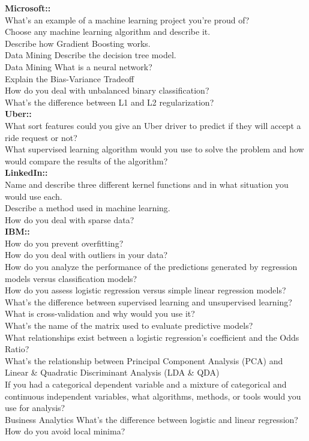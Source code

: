 \documentclass[11pt]{article}
\begin{document}
{\bf Microsoft:: }\\
What’s an example of a machine learning project you’re proud of?\\
Choose any machine learning algorithm and describe it.\\
Describe how Gradient Boosting works.\\
Data Mining Describe the decision tree model.\\
Data Mining What is a neural network?\\
Explain the Bias-Variance Tradeoff\\
How do you deal with unbalanced binary classification?\\
What’s the difference between L1 and L2 regularization?\\

{\bf Uber:: }  \\
What sort features could you give an Uber driver to predict if they will accept a ride request or not? \\ 
What supervised learning algorithm would you use to solve the problem and how would compare the results of the algorithm?\\

{\bf LinkedIn:: }\\
Name and describe three different kernel functions and in what situation you would use each.\\
Describe a method used in machine learning.\\
How do you deal with sparse data?\\

{\bf IBM:: }\\
How do you prevent overfitting?\\
How do you deal with outliers in your data?\\
How do you analyze the performance of the predictions generated by regression models versus classification models?\\
How do you assess logistic regression versus simple linear regression models?\\
What’s the difference between supervised learning and unsupervised learning?\\
What is cross-validation and why would you use it?\\
What’s the name of the matrix used to evaluate predictive models?\\
What relationships exist between a logistic regression’s coefficient and the Odds Ratio?\\
What’s the relationship between Principal Component Analysis (PCA) and Linear \& Quadratic Discriminant Analysis (LDA \& QDA) \\
If you had a categorical dependent variable and a mixture of categorical and continuous independent variables, what algorithms, methods, or tools would you use for analysis?\\
Business Analytics What’s the difference between logistic and linear regression? How do you avoid local minima?\\
\end{document}
